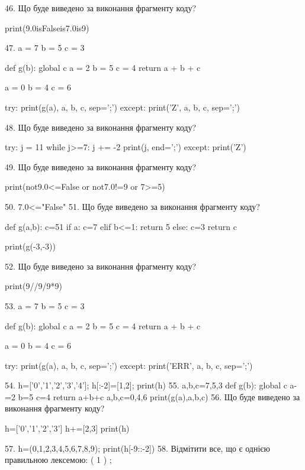 \documentclass[11pt]{article}
\begin{document}
46. Що буде виведено за виконання фрагменту коду?

print(9.0isFalseis7.0is9)

47. 
a = 7
b = 5
c = 3

def g(b):
global c    a = 2
    b = 5
    c = 4
    return a + b + c

a = 0
b = 4
c = 6

try:
    print(g(a), a, b, c, sep=';')
except:
    print('Z', a, b, c, sep=';')

48. Що буде виведено за виконання фрагменту коду?

try:
    j = 11
    while j>=7:
        j += -2
    print(j, end=';')
except:
    print('Z')


49. Що буде виведено за виконання фрагменту коду?

print(not9.0<=False or not7.0!=9 or 7>=5)

50. 
7.0<="False"
51. Що буде виведено за виконання фрагменту коду?

def g(a,b):
    c=51
    if a:
        c=7
    elif b<=1:
         return 5
    else: 
        c=3
    return c

print(g(-3,-3))

52. Що буде виведено за виконання фрагменту коду?

print(9//9/9*9)

53. 
a = 7
b = 5
c = 3

def g(b):
global c    a = 2
    b = 5
    c = 4
    return a + b + c

a = 0
b = 4
c = 6

try:
    print(g(a), a, b, c, sep=';')
except:
    print('ERR', a, b, c, sep=';')

54. 
h=['0','1','2','3','4']; h[:-2]=[1,2]; print(h)
55. 
a,b,c=7,5,3
    def g(b):
      global c      a-=2
      b=5
      c=4
      return a+b+c
    a,b,c=0,4,6
    print(g(a),a,b,c)
56. Що буде виведено за виконання фрагменту коду?

h=['0','1','2','3']
h+=[2,3]
print(h)


57. 
h=(0,1,2,3,4,5,6,7,8,9); print(h[-9::-2])
58. %
Відмітити все, що є однією правильною лексемою:
( 1 ) ;
\end{document}
